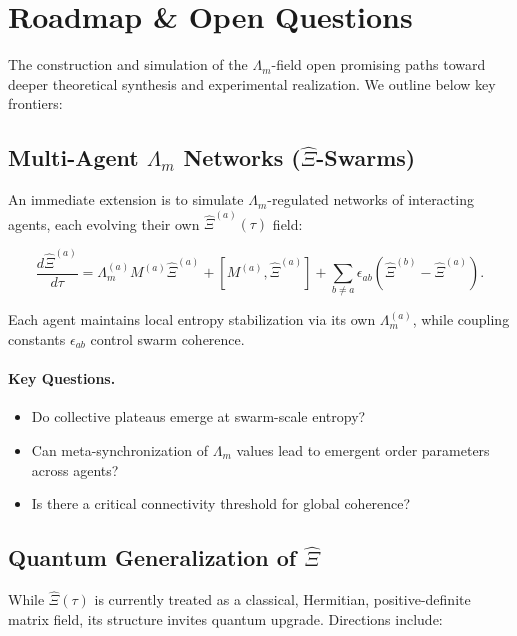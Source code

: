 \documentclass[12pt]{article}
\theoremstyle{plain}
\begin{document}
\section{Roadmap \& Open Questions}

The construction and simulation of the $\Lambda_m$-field open promising paths toward deeper theoretical synthesis and experimental realization. We outline below key frontiers:

\subsection{Multi-Agent $\Lambda_m$ Networks (\texorpdfstring{$\hat{\Xi}$}{Ξ̂}-Swarms)}

An immediate extension is to simulate $\Lambda_m$-regulated networks of interacting agents, each evolving their own $\hat{\Xi}^{(a)}(\tau)$ field:

\begin{equation}
\frac{d\hat{\Xi}^{(a)}}{d\tau} = \Lambda_m^{(a)} M^{(a)} \hat{\Xi}^{(a)} + [M^{(a)}, \hat{\Xi}^{(a)}] + \sum_{b \neq a} \epsilon_{ab} (\hat{\Xi}^{(b)} - \hat{\Xi}^{(a)}).
\end{equation}

Each agent maintains local entropy stabilization via its own $\Lambda_m^{(a)}$, while coupling constants $\epsilon_{ab}$ control swarm coherence.

\paragraph{Key Questions.}
\begin{itemize}
    \item Do collective plateaus emerge at swarm-scale entropy?
    \item Can meta-synchronization of $\Lambda_m$ values lead to emergent order parameters across agents?
    \item Is there a critical connectivity threshold for global coherence?
\end{itemize}

\subsection{Quantum Generalization of $\hat{\Xi}$}

While $\hat{\Xi}(\tau)$ is currently treated as a classical, Hermitian, positive-definite matrix field, its structure invites quantum upgrade. Directions include:
\end{document}
